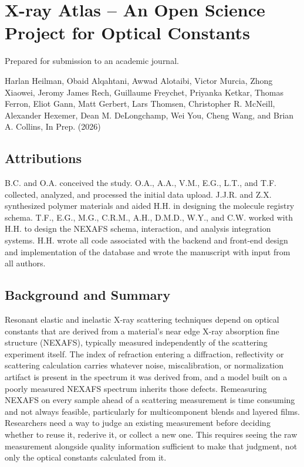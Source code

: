 \chapter{X-ray Atlas -- An Open Science Project for Optical Constants}\label{chap:xray-atlas}

Prepared for submission to an academic journal.

Harlan Heilman, Obaid Alqahtani, Awwad Alotaibi, Victor Murcia, Zhong Xiaowei, Jeromy James Rech, Guillaume Freychet, Priyanka Ketkar, Thomas Ferron, Eliot Gann, Matt Gerbert, Lars Thomsen, Christopher R. McNeill, Alexander Hexemer, Dean M. DeLongchamp, Wei You, Cheng Wang, and Brian A. Collins, In Prep. (2026)

\section{Attributions}\label{sec:attributions-2}

B.C. and O.A. conceived the study. O.A., A.A., V.M., E.G., L.T., and T.F. collected, analyzed, and processed the initial data upload. J.J.R. and Z.X. synthesized polymer materials and aided H.H. in designing the molecule registry schema. T.F., E.G., M.G., C.R.M., A.H., D.M.D., W.Y., and C.W. worked with H.H. to design the NEXAFS schema, interaction, and analysis integration systems. H.H. wrote all code associated with the backend and front-end design and implementation of the database and wrote the manuscript with input from all authors.

\section{Background and Summary}\label{sec:background-and-summary}

Resonant elastic and inelastic X-ray scattering techniques depend on optical constants that are derived from a material's near edge X-ray absorption fine structure (NEXAFS), typically measured independently of the scattering experiment itself.\autocite{yanAccurateFacileDetermination2013,wattsCalculationKramersKronigTransform2014} The index of refraction entering a diffraction, reflectivity or scattering calculation carries whatever noise, miscalibration, or normalization artifact is present in the spectrum it was derived from, and a model built on a poorly measured NEXAFS spectrum inherits those defects. Remeasuring NEXAFS on every sample ahead of a scattering measurement is time consuming and not always feasible, particularly for multicomponent blends and layered films. Researchers need a way to judge an existing measurement before deciding whether to reuse it, rederive it, or collect a new one. This requires seeing the raw measurement alongside quality information sufficient to make that judgment, not only the optical constants calculated from it.

